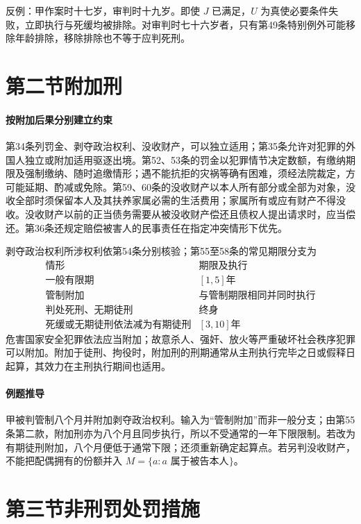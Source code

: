 反例：甲作案时十七岁，审判时十九岁。即使 \(J\) 已满足，\(U\) 为真使必要条件失败，立即执行与死缓均被排除。对审判时七十六岁者，只有第49条特别例外可能移除年龄排除，移除排除也不等于应判死刑。

\section{第二节\quad 附加刑}
\paragraph{按附加后果分别建立约束}
第34条列罚金、剥夺政治权利、没收财产，可以独立适用；第35条允许对犯罪的外国人独立或附加适用驱逐出境。第52、53条的罚金以犯罪情节决定数额，有缴纳期限及强制缴纳、随时追缴情形；遇不能抗拒的灾祸等确有困难，须经法院裁定，方可能延期、酌减或免除。第59、60条的没收财产以本人所有部分或全部为对象，没收全部时须保留本人及其扶养家属必需的生活费用；家属所有或应有财产不得没收。没收财产以前的正当债务需要从被没收财产偿还且债权人提出请求时，应当偿还。第36条还规定赔偿被害人的民事责任在指定冲突情形下优先。

剥夺政治权利所涉权利依第54条分别核验；第55至58条的常见期限分支为
\[
\begin{array}{l|l}
\text{情形} & \text{期限及执行}\\ \hline
\text{一般有限期} & [1,5]\text{年}\\
\text{管制附加} & \text{与管制期限相同并同时执行}\\
\text{判处死刑、无期徒刑} & \text{终身}\\
\text{死缓或无期徒刑依法减为有期徒刑} & [3,10]\text{年}
\end{array}
\]
危害国家安全犯罪依法应当附加；故意杀人、强奸、放火等严重破坏社会秩序犯罪可以附加。附加于徒刑、拘役时，附加刑的刑期通常从主刑执行完毕之日或假释日起算，其效力在主刑执行期间也适用。

\paragraph{例题推导}
甲被判管制八个月并附加剥夺政治权利。输入为“管制附加”而非一般分支；由第55条第二款，附加刑亦为八个月且同步执行，所以不受通常的一年下限限制。若改为有期徒刑附加，八个月便低于通常下限；还须重新确定起算点。若另判没收财产，不能把配偶拥有的份额并入 \(M=\{a:a\text{ 属于被告本人}\}\)。

\section{第三节\quad 非刑罚处罚措施}
